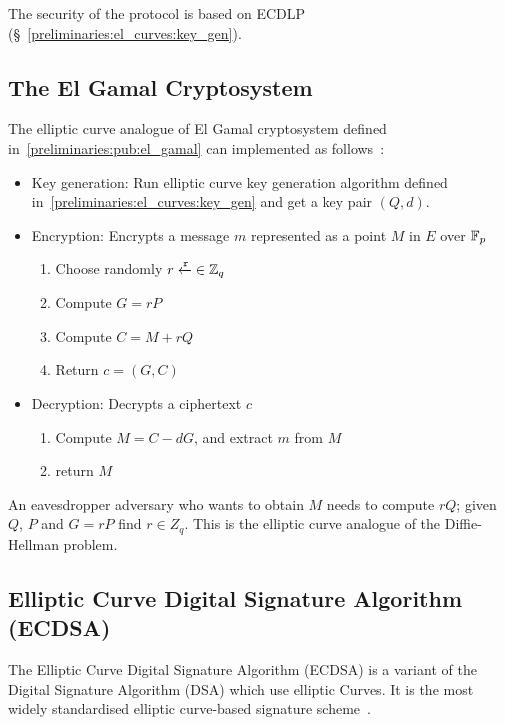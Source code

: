 The security of the protocol is based on ECDLP (§~\ref{preliminaries:el_curves:key_gen}).

\subsection{The El Gamal Cryptosystem}
\label{preliminaries:el_curves:el_gamal}

The elliptic curve analogue of El Gamal cryptosystem defined in~\ref{preliminaries:pub:el_gamal} can implemented as follows~\cite{elliptic_curves_2}:

\begin{itemize}
  \item Key generation: Run elliptic curve key generation algorithm defined in~\ref{preliminaries:el_curves:key_gen} and get a key pair $(Q, d)$.
  \item Encryption: Encrypts a message $m$ represented as a point $M$ in $E$ over $\mathbb{F}_p$
    \begin{enumerate}
      \item Choose randomly $r \xleftarrow{\mathtt{r}}{\in \mathbb{Z}_q}$
      \item Compute $G = rP$
      \item Compute $C = M + rQ$
      \item Return $c = (G, C)$
    \end{enumerate}
  \item Decryption: Decrypts a ciphertext $c$
    \begin{enumerate}
      \item Compute $M = C - dG$, and extract $m$ from $M$
      \item return $M$
    \end{enumerate}
\end{itemize}

An eavesdropper adversary who wants to obtain $M$ needs to compute $rQ$; given $Q$, $P$ and $G = rP$ find $r \in Z_q$. This is the elliptic curve analogue of the Diffie-Hellman problem.

\subsection{Elliptic Curve Digital Signature Algorithm (ECDSA)}
\label{preliminaries:sign:el_curves:ecdsa}

The Elliptic Curve Digital Signature Algorithm (ECDSA) is a variant of the Digital Signature Algorithm (DSA) which use elliptic Curves. It is the most widely standardised elliptic curve-based signature scheme~\cite{elliptic_curves_2}.

